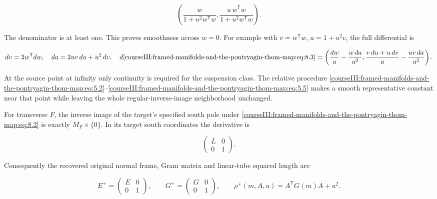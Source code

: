 \begin{equation}
\left(\frac{w}{1+u^2w^{\mathsf T}w},
       \frac{u\,w^{\mathsf T}w}{1+u^2w^{\mathsf T}w}\right).
 \label{courseIII:framed-manifolds-and-the-pontryagin-thom-map:eq:8.3}
\end{equation}

The denominator is at least one. This proves smoothness across \(w=0\). For example with \(v=w^{\mathsf T}w\), \(a=1+u^2v\), the full differential is

\begin{equation}
dv=2w^{\mathsf T}dw,\quad da=2uv\,du+u^2\,dv,\quad
 d\eqref{courseIII:framed-manifolds-and-the-pontryagin-thom-map:eq:8.3}=
 \left(\frac{dw}{a}-\frac{w\,da}{a^2},
       \frac{v\,du+u\,dv}{a}-\frac{uv\,da}{a^2}\right).
 \label{courseIII:framed-manifolds-and-the-pontryagin-thom-map:eq:8.4}
\end{equation}

At the source point at infinity only continuity is required for the suspension class. The relative procedure \eqref{courseIII:framed-manifolds-and-the-pontryagin-thom-map:eq:5.2}--\eqref{courseIII:framed-manifolds-and-the-pontryagin-thom-map:eq:5.5} makes a smooth representative constant near that point while leaving the whole regular-inverse-image neighborhood unchanged.

For transverse \(F\), the inverse image of the target's specified south pole under \eqref{courseIII:framed-manifolds-and-the-pontryagin-thom-map:eq:8.2} is exactly \(M_F\times\{0\}\). In its target south coordinates the derivative is

\begin{equation}
\begin{pmatrix}L&0\\0&1\end{pmatrix}.
 \label{courseIII:framed-manifolds-and-the-pontryagin-thom-map:eq:8.5}
\end{equation}

Consequently the recovered original normal frame, Gram matrix and linear-tube squared length are

\begin{equation}
E^+=
 \begin{pmatrix}E&0\\0&1\end{pmatrix},\qquad
 G^+=\begin{pmatrix}G&0\\0&1\end{pmatrix},\qquad
 \rho^+(m,A,u)=A^{\mathsf T}G(m)A+u^2.
 \label{courseIII:framed-manifolds-and-the-pontryagin-thom-map:eq:8.6}
\end{equation}

